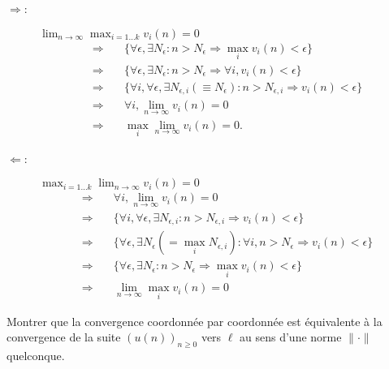 \proof
\begin{description}
  \item[$\Rightarrow$:] $\lim_{n \rightarrow \infty} \max_{i=1 \dots k} v_i(n) = 0$
  \begin{align*}
    \Rightarrow \quad & \{\forall \epsilon, \exists N_\epsilon: n > N_\epsilon \Rightarrow \max_i v_i(n) < \epsilon\} \\
    \Rightarrow \quad & \{\forall \epsilon, \exists N_\epsilon: n > N_\epsilon \Rightarrow \forall i, v_i(n) < \epsilon\} \\
    \Rightarrow \quad & \{\forall i, \forall \epsilon, \exists N_{\epsilon, i}(\equiv N_\epsilon): n > N_{\epsilon, i} \Rightarrow v_i(n) < \epsilon\} \\
    \Rightarrow \quad & \forall i, \lim_{n \rightarrow \infty} v_i(n) = 0 \\
    \Rightarrow \quad & \max_i \lim_{n \rightarrow \infty} v_i(n) = 0.
  \end{align*}
  \item[$\Leftarrow$:] $\max_{i=1 \dots k} \lim_{n \rightarrow \infty} v_i(n) = 0$
  \begin{align*}
    \Rightarrow \quad & \forall i, \lim_{n \rightarrow \infty} v_i(n) = 0 \\
    \Rightarrow \quad & \{\forall i, \forall \epsilon, \exists N_{\epsilon, i}: n > N_{\epsilon, i} \Rightarrow v_i(n) < \epsilon\}\\
    \Rightarrow \quad & \{\forall \epsilon, \exists N_\epsilon (= \max_i N_{\epsilon, i}): \forall i, n > N_\epsilon \Rightarrow v_i(n) < \epsilon\}\\
    \Rightarrow \quad & \{\forall \epsilon, \exists N_\epsilon: n > N_\epsilon \Rightarrow \max_i v_i(n) < \epsilon\}\\
    \Rightarrow \quad & \lim_{n \rightarrow \infty} \max_i v_i(n) = 0
  \end{align*}
\end{description}
\eproof

\begin{exercise*}
  Montrer que la convergence coordonnée par coordonnée est équivalente à la convergence de la suite $(u(n))_{n \geq 0}$ vers $\ell$ au sens d'une norme $\|\cdot\|$ quelconque.
\end{exercise*}

